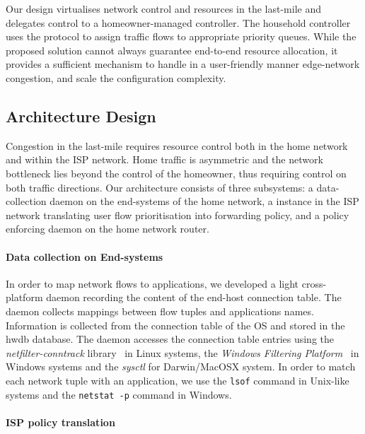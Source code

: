 Our design virtualises network control and resources in the last-mile and
delegates control to a homeowner-managed \of controller.  The household
controller uses the \of protocol to assign traffic flows to appropriate
priority queues.  While the proposed solution cannot always guarantee
end-to-end resource allocation, it provides a sufficient mechanism to handle in
a user-friendly manner edge-network congestion, and scale the configuration
complexity. 

\subsection{Architecture Design} \label{s:qos:architecture}

Congestion in the last-mile requires resource control both in the home network
and within the ISP network. Home traffic is asymmetric and  the network
bottleneck lies beyond the control of the homeowner, thus requiring control on
both traffic directions.  Our architecture consists of three subsystems: a
data-collection daemon on the end-systems of the home network, a \flv
instance in the ISP network translating user flow prioritisation into
forwarding policy, and a policy enforcing daemon on the home network router. 

\paragraph*{Data collection on End-systems}

In order to map network flows to applications, we developed a light cross-platform
daemon recording the content of the end-host connection table.  The daemon
collects mappings between flow tuples and applications names.  Information is
collected from the connection table of the OS and stored in the hwdb database.
The daemon accesses the connection table entries using the
\textit{netfilter-conntrack} library~ in Linux systems, the
\textit{Windows Filtering Platform}~ in Windows systems and the
\textit{sysctl} for Darwin/MacOSX system.  In order to match each network tuple
with an application, we use the \texttt{lsof} command in Unix-like systems and
the \texttt{netstat -p} command in Windows.


\paragraph*{ISP policy translation}

